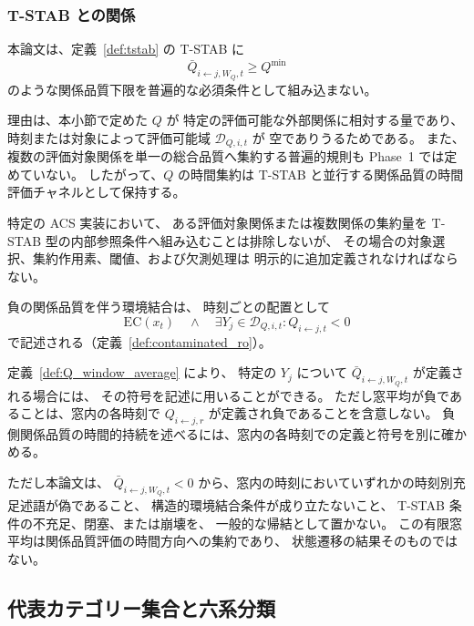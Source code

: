 \subsubsection{T-STAB との関係}

\begin{remark}
\label{rem:Q_not_tstab_core}
本論文は、定義~\ref{def:tstab} の T-STAB に
\[
  \bar Q_{i\leftarrow j,W_Q,t}\ge Q^{\min}
\]
のような関係品質下限を普遍的な必須条件として組み込まない。

理由は、本小節で定めた $Q$ が
特定の評価可能な外部関係に相対する量であり、
時刻または対象によって評価可能域 $\mathcal D_{Q,i,t}$ が
空でありうるためである。
また、複数の評価対象関係を単一の総合品質へ集約する普遍的規則も
Phase~1 では定めていない。
したがって、$Q$ の時間集約は
T-STAB と並行する関係品質の時間評価チャネルとして保持する。

特定の ACS 実装において、
ある評価対象関係または複数関係の集約量を
T-STAB 型の内部参照条件へ組み込むことは排除しないが、
その場合の対象選択、集約作用素、閾値、および欠測処理は
明示的に追加定義されなければならない。
\end{remark}

\begin{remark}[負の関係品質を伴う環境結合の時間評価]
\label{rem:contaminated_ro_temporal}
負の関係品質を伴う環境結合は、
時刻ごとの配置として
\[
  \mathrm{EC}(x_t)
  \quad\wedge\quad
  \exists Y_j\in\mathcal D_{Q,i,t}:
  Q_{i\leftarrow j,t}<0
\]
で記述される（定義~\ref{def:contaminated_ro}）。

定義~\ref{def:Q_window_average} により、
特定の $Y_j$ について $\bar Q_{i\leftarrow j,W_Q,t}$ が定義される場合には、
その符号を記述に用いることができる。
ただし窓平均が負であることは、窓内の各時刻で $Q_{i\leftarrow j,r}$ が定義され負であることを含意しない。
負側関係品質の時間的持続を述べるには、窓内の各時刻での定義と符号を別に確かめる。

ただし本論文は、
$\bar Q_{i\leftarrow j,W_Q,t}<0$
から、窓内の時刻においていずれかの時刻別充足述語が偽であること、
構造的環境結合条件が成り立たないこと、
T-STAB 条件の不充足、閉塞、または崩壊を、
一般的な帰結として置かない。
この有限窓平均は関係品質評価の時間方向への集約であり、
状態遷移の結果そのものではない。
\end{remark}

\subsection{代表カテゴリー集合と六系分類}
\label{subsec:rel_categories}

